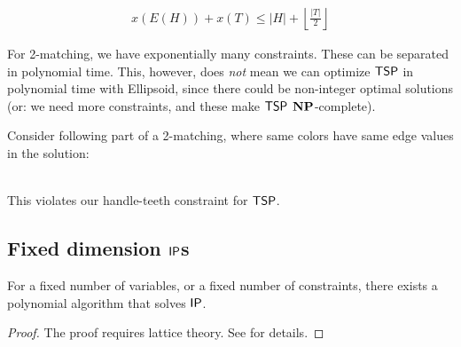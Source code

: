 \begin{align*}
    x(E(H)) + x(T) \leq |H|+ \left\lfloor \frac{|T|}{2}\right\rfloor
\end{align*}

\begin{note}
    For 2-matching, we have exponentially many constraints.
    These can be separated in polynomial time.
    This, however, does \emph{not} mean we can optimize $\mathsf{TSP}$ in polynomial time with Ellipsoid,
    since there could be non-integer optimal solutions (or: we need more constraints, and these make $\mathsf{TSP}$ $\mathbf{NP}$-complete).
\end{note}
\begin{example}
    Consider following part of a 2-matching, where same colors have same edge values in the solution:
    \vspace{5pt}
    \\
    \begin{minipage}{\textwidth}
        \centering
    \end{minipage}
    \\
    \vspace{5pt}
    This violates our handle-teeth constraint for $\mathsf{TSP}$.
\end{example}

\subsection{Fixed dimension $\mathsf{IP}$s}
\begin{theorem}
    For a fixed number of variables, or a fixed number of constraints, there exists a polynomial algorithm that solves $\mathsf{IP}$.
\end{theorem}
\begin{proof}
    The proof requires lattice theory. See \cite[Ch. 2-6.5, Thm.~5.4+5]{int-comb-optimization} for details.
\end{proof}

